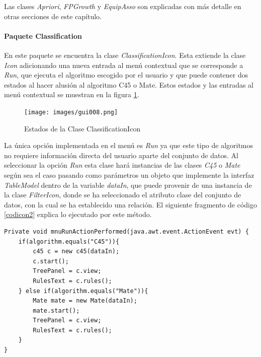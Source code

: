 Las clases \textit{Apriori}, \textit{FPGrowth} y \textit{EquipAsso} son explicadas con m\'as detalle en otras
secciones de este cap\'itulo.
\paragraph{Paquete Classification}
En este paquete se encuentra la clase \textit{ClassificationIcon}.  Esta extiende la clase \textit{Icon}
adicionando una nueva entrada al men\'u contextual que se corresponde a \textit{Run}, que ejecuta el algoritmo
escogido por el usuario y que puede contener dos estados al hacer alusi\'on al algoritmo C45 o Mate.  Estos
estados y las entradas al men\'u contextual se muestran en la figura \ref{gui008}.\\

\begin{figure}[h]
\centering
\texttt{[image: images/gui008.png]}
\caption{Estados de la Clase ClassificationIcon}
\label{gui008}
\end{figure}

La \'unica opci\'on implementada en el men\'u es \textit{Run} ya que este tipo de algoritmos no requiere
informaci\'on directa del usuario aparte del conjunto de datos.  Al seleccionar la opci\'on \textit{Run} esta
clase har\'a instancias de las clases \textit{C45} o \textit{Mate} seg\'un sea el caso pasando como par\'ametros
un objeto que implemente la interfaz \textit{TableModel} dentro de la variable \textit{dataIn}, que puede
provenir de una instancia de la clase \textit{FilterIcon}, donde se ha seleccionado el atributo clase del
conjunto de datos, con la cual se ha establecido una relaci\'on.  El siguiente fragmento de c\'odigo \ref{codicon2}
explica lo ejecutado por este m\'etodo.\\

\begin{codigof}[t]
\begin{verbatim}
Private void mnuRunActionPerformed(java.awt.event.ActionEvent evt) {
    if(algorithm.equals("C45")){
        c45 c = new c45(dataIn);
        c.start();
        TreePanel = c.view;
        RulesText = c.rules();
    } else if(algorithm.equals("Mate")){
        Mate mate = new Mate(dataIn);
        mate.start();
        TreePanel = c.view;
        RulesText = c.rules();
    }
}
\end{verbatim}
\caption{Ejecuci\'on de un algoritmo}
\label{codicon2}
\end{codigof}

